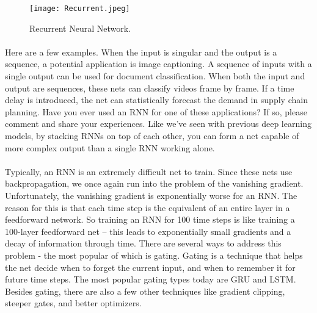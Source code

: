 \documentclass{article}
\begin{document}
    \begin{figure}[h!]
      \begin{center}
        \texttt{[image: Recurrent.jpeg]}
        \caption{Recurrent Neural Network.}
        \label{fig:snn}
      \end{center}
    \end{figure}
    
    \paragraph{}
    Here are a few examples. When the input is  singular and the output is a sequence, a potential  application is image captioning. A sequence  of inputs with a single output can be used  for document classification. When both the  input and output are sequences, these nets  can classify videos frame by frame. If a time  delay is introduced, the net can statistically  forecast the demand in supply chain planning.  Have you ever used an RNN for one of these  applications? If so, please comment and share  your experiences.  Like we’ve seen with previous deep learning  models, by stacking RNNs on top of each other,  you can form a net capable of more complex  output than a single RNN working alone.
    \paragraph{}
    Typically, an RNN is an extremely difficult  net to train. Since these nets use backpropagation,  we once again run into the problem of the  vanishing gradient. Unfortunately, the vanishing  gradient is exponentially worse for an RNN.  The reason for this is that each time step  is the equivalent of an entire layer in a  feedforward network. So training an RNN for  100 time steps is like training a 100-layer  feedforward net – this leads to exponentially  small gradients and a decay of information  through time.  There are several ways to address this problem  - the most popular of which is gating. Gating  is a technique that helps the net decide when  to forget the current input, and when to remember  it for future time steps. The most popular  gating types today are GRU and LSTM. Besides  gating, there are also a few other techniques  like gradient clipping, steeper gates, and  better optimizers.
\end{document}

